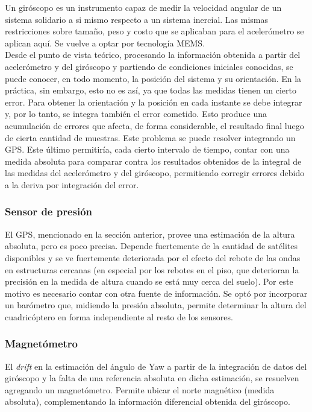 \documentclass[main]{subfiles}
\begin{document}
Un gir\'oscopo es un instrumento capaz de medir la velocidad angular de un sistema solidario a si mismo respecto a un sistema inercial. Las mismas restricciones sobre tama\~no, peso y costo que se aplicaban para el aceler\'ometro se aplican aqu\'i. Se vuelve a optar por tecnolog\'ia MEMS.\\ 

Desde el punto de vista te\'orico, procesando la informaci\'on obtenida a partir del aceler\'ometro y del gir\'oscopo y partiendo de condiciones iniciales conocidas, se puede conocer, en todo momento, la posici\'on del sistema y su orientaci\'on. En la pr\'actica, sin embargo, esto no es as\'i, ya que todas las medidas tienen un cierto error. Para obtener la orientaci\'on y la posici\'on en cada instante se debe integrar y, por lo tanto, se integra tambi\'en el error cometido. Esto produce una acumulaci\'on de errores que afecta, de forma considerable, el resultado final luego de cierta cantidad de muestras. Este problema se puede resolver integrando un GPS. Este \'ultimo permitir\'ia, cada cierto intervalo de tiempo, contar con una medida absoluta para comparar contra los resultados obtenidos de la integral de las medidas del aceler\'ometro y del gir\'oscopo, permitiendo corregir errores debido a la deriva por integraci\'on del error.

\subsubsection{Sensor de presi\'on}

El GPS, mencionado en la secci\'on anterior, provee una estimaci\'on de la altura absoluta, pero es poco precisa. Depende fuertemente de la cantidad de sat\'elites disponibles y se ve fuertemente deteriorada por el efecto del rebote de las ondas en estructuras cercanas (en especial por los rebotes en el piso, que deterioran la precisi\'on en la medida de altura cuando se est\'a muy cerca del suelo). Por este motivo es necesario contar con otra fuente de informaci\'on. Se opt\'o por incorporar un bar\'ometro que, midiendo la presi\'on absoluta, permite determinar la altura del cuadric\'optero en forma independiente al resto de los sensores.

\subsubsection{Magnet\'ometro}

El \textit{drift} en la estimaci\'on del \'angulo de Yaw a partir de la integraci\'on de datos del gir\'oscopo y la falta de una referencia absoluta en dicha estimaci\'on, se resuelven agregando un magnet\'ometro. Permite ubicar el norte magn\'etico (medida absoluta), complementando la informaci\'on diferencial obtenida del gir\'oscopo.
\end{document}
